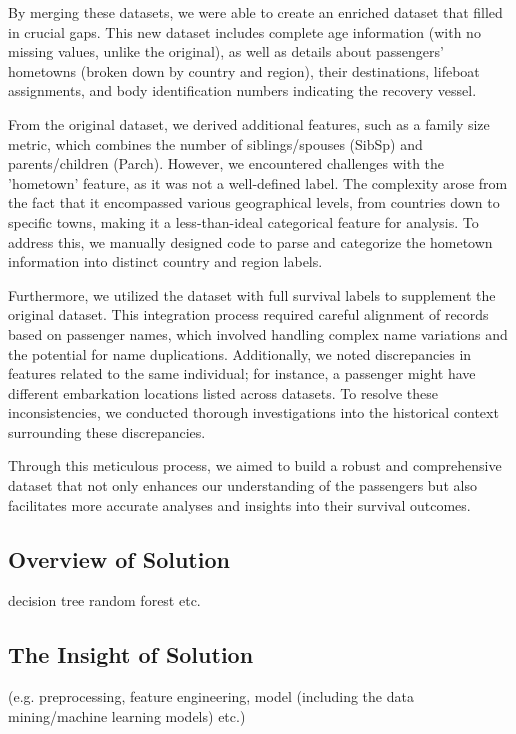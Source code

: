 \documentclass[conference]{IEEEtran}
\begin{document}
By merging these datasets, we were able to create an enriched dataset that filled in crucial gaps. This new dataset includes complete age information (with no missing values, unlike the original), as well as details about passengers' hometowns (broken down by country and region), their destinations, lifeboat assignments, and body identification numbers indicating the recovery vessel.

From the original dataset, we derived additional features, such as a family size metric, which combines the number of siblings/spouses (SibSp) and parents/children (Parch). However, we encountered challenges with the 'hometown' feature, as it was not a well-defined label. The complexity arose from the fact that it encompassed various geographical levels, from countries down to specific towns, making it a less-than-ideal categorical feature for analysis. To address this, we manually designed code to parse and categorize the hometown information into distinct country and region labels.

Furthermore, we utilized the dataset with full survival labels to supplement the original dataset. This integration process required careful alignment of records based on passenger names, which involved handling complex name variations and the potential for name duplications. Additionally, we noted discrepancies in features related to the same individual; for instance, a passenger might have different embarkation locations listed across datasets. To resolve these inconsistencies, we conducted thorough investigations into the historical context surrounding these discrepancies.

Through this meticulous process, we aimed to build a robust and comprehensive dataset that not only enhances our understanding of the passengers but also facilitates more accurate analyses and insights into their survival outcomes.

\subsection{ Overview of Solution}
decision tree
random forest
etc.

\subsection{The Insight of Solution} 

(e.g. preprocessing, feature engineering, model (including the data mining/machine learning models) etc.)
\end{document}
